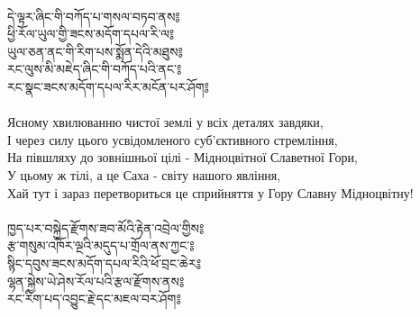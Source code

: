\\
\newpage
{\ti དེ་ལྟར་ཞིང་གི་བཀོད་པ་གསལ་བཏབ་ནས༔\\
ཕྱི་རོལ་ཡུལ་གྱི་ཟངས་མདོག་དཔལ་རི་ལ༔\\
ཡུལ་ཅན་ནང་གི་རིག་པས་སྨོན་དེའི་མཐུས༔\\
རང་ལུས་མི་མཇེད་ཞིང་གི་བཀོད་པའི་ནང་༔\\
རང་སྣང་ཟངས་མདོག་དཔལ་རིར་མངོན་པར་ཤོག༔}\\
\\
\ru
Ясному хвилюванню чистої землі у всіх деталях завдяки,\\
І через силу цього усвідомленого суб'єктивного стремління, \\
На півшляху до зовнішньої цілі - Мідноцвітної Славетної Гори,\\
У цьому ж тілі, а це Саха - світу нашого явління,\\
Хай тут і зараз перетвориться це сприйняття у Гору Славну Мідноцвітну!\\
\\
{\ti ཁྱད་པར་བསྐྱེད་རྫོགས་ཟབ་མོའི་རྟེན་འབྲེལ་གྱིས༔\\
རྩ་གསུམ་འཁོར་ལྔའི་མདུད་པ་གྲོལ་ནས་ཀྱང་༔\\
སྙིང་དབུས་ཟངས་མདོག་དཔལ་རིའི་ཕོ་བྲང་ཆེར༔\\
ལྷན་སྐྱེས་ཡེ་ཤེས་རོལ་པའི་རྩལ་རྫོགས་ནས༔\\
རང་རིག་པད་འབྱུང་རྗེ་དང་མཇལ་བར་ཤོག༔}\\
\\
